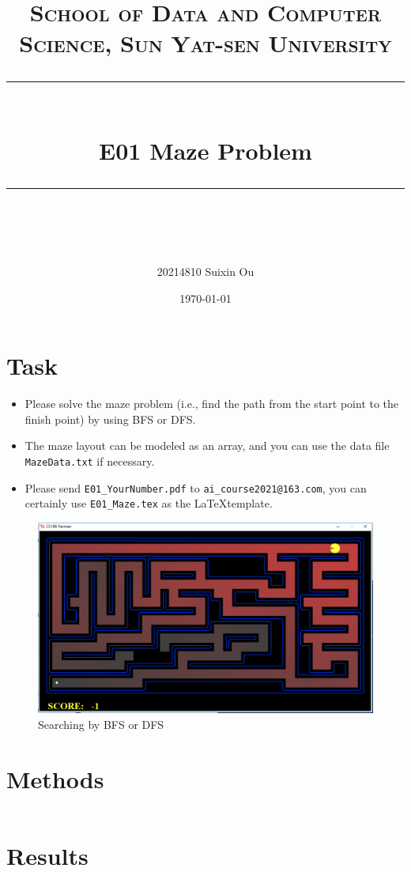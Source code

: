 \documentclass[a4paper, 11pt]{article}
\title{	
\normalfont \normalsize
\textsc{School of Data and Computer Science, Sun Yat-sen University} \\ [25pt] %
\rule{\textwidth}{0.5pt} \\[0.4cm] %
\huge  E01 Maze Problem\\ %
\rule{\textwidth}{2pt} \\[0.5cm] %
\author{20214810 Suixin Ou}
\date{\normalsize\today}
}
\begin{document}
\maketitle
\tableofcontents
\newpage
\section{Task}



\begin{itemize}
	\item Please solve the maze problem (i.e., find the path from the start point to the finish point) by using BFS or DFS.
	\item The maze layout can be modeled as an array, and you can use the data file \texttt{MazeData.txt} if necessary.
	\item Please send \texttt{E01\_YourNumber.pdf} to \texttt{ai\_course2021@163.com}, you can certainly use \texttt{E01\_Maze.tex} as the \LaTeX template.
\end{itemize}

\begin{figure}[ht]
\centering
\includegraphics[width=15cm]{Pic/Pacman}

\caption{Searching by BFS or DFS}
\end{figure}
\section{Methods}
\lstset{language=C++}
\begin{lstlisting}

\end{lstlisting}
\section{Results}
\begin{figure}
\centering
\end{figure}


%
%
\end{document}
